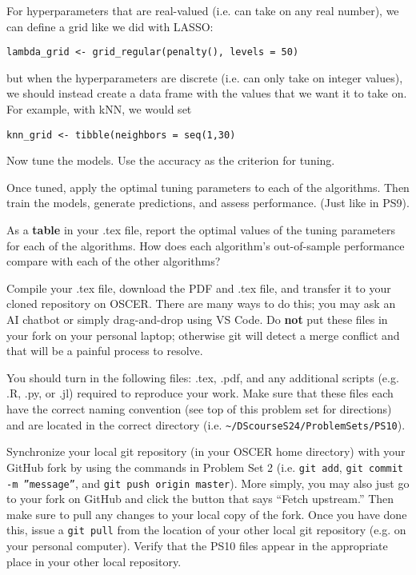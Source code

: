 \documentclass[12pt,english]{exam}
\begin{document}
\begin{questions}
For hyperparameters that are real-valued (i.e. can take on any real number), we can define a grid like we did with LASSO:

\texttt{lambda\_grid <- grid\_regular(penalty(), levels = 50)}

\bigskip
but when the hyperparameters are discrete (i.e. can only take on integer values), we should instead create a data frame with the values that we want it to take on. For example, with kNN, we would set

\texttt{knn\_grid <- tibble(neighbors = seq(1,30)}

\question Now tune the models. Use the accuracy as the criterion for tuning. %

\question Once tuned, apply the optimal tuning parameters to each of the algorithms. Then train the models, generate predictions, and assess performance. (Just like in PS9).

\question As a \textbf{table} in your .tex file, report the optimal values of the tuning parameters for each of the algorithms. How does each algorithm's out-of-sample performance compare with each of the other algorithms?

\question Compile your .tex file, download the PDF and .tex file, and transfer it to your cloned repository on OSCER. There are many ways to do this;  you may ask an AI chatbot or simply drag-and-drop using VS Code. Do \textbf{not} put these files in your fork on your personal laptop; otherwise git will detect a merge conflict and that will be a painful process to resolve.

\question You should turn in the following files: .tex, .pdf, and any additional scripts (e.g. .R, .py, or .jl) required to reproduce your work.  Make sure that these files each have the correct naming convention (see top of this problem set for directions) and are located in the correct directory (i.e. \texttt{\textasciitilde/DScourseS24/ProblemSets/PS10}).

\question Synchronize your local git repository (in your OSCER home directory) with your GitHub fork by using the commands in Problem Set 2 (i.e. \texttt{git add}, \texttt{git commit -m ''message''}, and \texttt{git push origin master}). More simply, you may also just go to your fork on GitHub and click the button that says ``Fetch upstream.'' Then make sure to pull any changes to your local copy of the fork. Once you have done this, issue a \texttt{git pull} from the location of your other local git repository (e.g. on your personal computer). Verify that the PS10 files appear in the appropriate place in your other local repository.

\end{questions}
\end{document}

